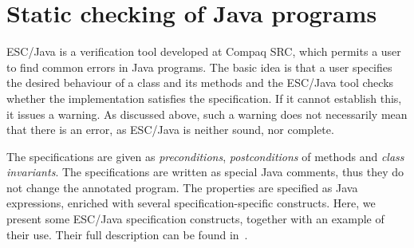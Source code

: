 \documentclass[a4paper]{llncs}
\begin{document}
\section{Static checking of Java programs}
\label{SectStatic}


\label{SubSectEscJava}

ESC/Java is a verification tool developed at Compaq SRC, which permits
a user to find common errors in Java programs. The basic idea is that
a user specifies the desired behaviour of a class and its methods and
the ESC/Java tool checks whether the implementation satisfies the
specification. If it cannot establish this, it issues a warning. As
discussed above, such a warning does not necessarily mean that there
is an error, as ESC/Java is neither sound, nor complete.

The specifications are given as
\textit{preconditions}, \textit{postconditions} of methods and 
\textit{class
invariants}. The specifications are written as special Java comments,
thus they do not change the annotated program.  The properties are
specified as Java expressions, enriched with several
specification-specific constructs. Here, we present some ESC/Java
specification constructs, together with an example of their use. Their
full description can be found in~\cite{LeinoNS00}.
\end{document}
